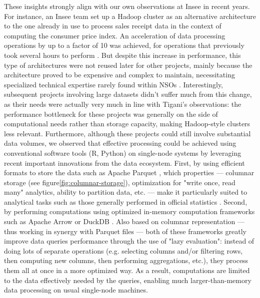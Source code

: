 \documentclass[graybox]{svmult}
\begin{document}
These insights strongly align with our own observations at Insee in recent years. For instance, an Insee team set up a Hadoop cluster as an alternative architecture to the one already in use to process sales receipt data in the context of computing the consumer price index. An acceleration of data processing operations by up to a factor of 10 was achieved, for operations that previously took several hours to perform \cite{leclair2019utiliser}. But despite this increase in performance, this type of architectures were not reused later for other projects, mainly because the architecture proved to be expensive and complex to maintain, necessitating specialized technical expertise rarely found within NSOs \cite{vale2015international}. Interestingly, subsequent projects involving large datasets didn't suffer much from this change, as their needs were actually very much in line with Tigani's observations: the performance bottleneck for these projects was generally on the side of computational needs rather than storage capacity, making Hadoop-style clusters less relevant. Furthermore, although these projects could still involve substantial data volumes, we observed that effective processing could be achieved using conventional software tools (R, Python) on single-node systems by leveraging recent important innovations from the data ecosystem. First, by using efficient formats to store the data such as Apache Parquet \cite{parquet2013}, which properties — columnar storage \cite{abadi2013design} (see figure\ref{fig:columnar-storage}), optimization for "write once, read many" analytics, ability to partition data, etc. — make it particularly suited to analytical tasks such as those generally performed in official statistics \cite{abdelaziz2023optimizing}. Second, by performing computations using optimized in-memory computation frameworks such as Apache Arrow \cite{arrow2016} or DuckDB \cite{raasveldt2019duckdb}. Also based on columnar representation — thus working in synergy with Parquet files — both of these frameworks greatly improve data queries performance through the use of "lazy evaluation": instead of doing lots of separate operations (e.g. selecting columns and/or filtering rows, then computing new columns, then performing aggregations, etc.), they process them all at once in a more optimized way. As a result, computations are limited to the data effectively needed by the queries, enabling much larger-than-memory data processing on usual single-node machines.
\end{document}
